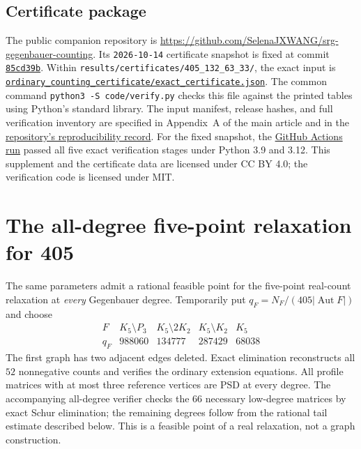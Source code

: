 \documentclass[11pt]{article}
\theoremstyle{remark}
\numberwithin{equation}{section}
\begin{document}
\begin{longtable}{rcl}
\end{longtable}
\endgroup

\subsection*{Certificate package}
\begingroup\raggedright
The public companion repository is
\url{https://github.com/SelenaJXWANG/srg-gegenbauer-counting}.
Its \texttt{2026-10-14} certificate snapshot is fixed at commit
\href{https://github.com/SelenaJXWANG/srg-gegenbauer-counting/tree/85cd39b74c9ef8a61ab746deb1102af3eeae7e10}{\texttt{85cd39b}}.
Within \nolinkurl{results/certificates/405_132_63_33/}, the exact input is
\href{https://github.com/SelenaJXWANG/srg-gegenbauer-counting/blob/85cd39b74c9ef8a61ab746deb1102af3eeae7e10/results/certificates/405_132_63_33/ordinary_counting_certificate/exact_certificate.json}{\nolinkurl{ordinary_counting_certificate/exact_certificate.json}}.
The common command \texttt{python3 -S code/verify.py} checks this file
against the printed tables using Python's standard library. The input
manifest, release hashes, and full verification inventory are specified
in Appendix~A of the main article and in the
\href{https://github.com/SelenaJXWANG/srg-gegenbauer-counting/blob/main/docs/reproducibility_snapshot.md}{repository's reproducibility record}.
For the fixed snapshot, the
\href{https://github.com/SelenaJXWANG/srg-gegenbauer-counting/actions/runs/38571633757}{GitHub Actions run}
passed all five exact verification stages under Python 3.9 and 3.12.
This supplement and the certificate data are licensed under CC BY 4.0;
the verification code is licensed under MIT.\par
\endgroup


\clearpage\section{The all-degree five-point relaxation for 405}\label{app:405-tail}
The same parameters admit a rational feasible point for the five-point
real-count relaxation at \emph{every} Gegenbauer degree. Temporarily put
$q_F=N_F/(405|\operatorname{Aut}F|)$ and choose
\[
 \begin{array}{c|rrrr}
 F&K_5\setminus P_3&K_5\setminus2K_2&K_5\setminus K_2&K_5\\
 q_F&988060&134777&287429&68038
 \end{array}
\]
The first graph has two adjacent edges deleted.  Exact elimination
reconstructs all $52$ nonnegative counts and verifies the ordinary
extension equations.  All profile matrices with at most three
reference vertices are PSD at every degree.  The accompanying
all-degree verifier checks the $66$ necessary low-degree matrices
by exact Schur elimination; the remaining degrees follow from
the rational tail estimate described below.  This is a feasible
point of a real relaxation, not a graph construction.
\end{document}

